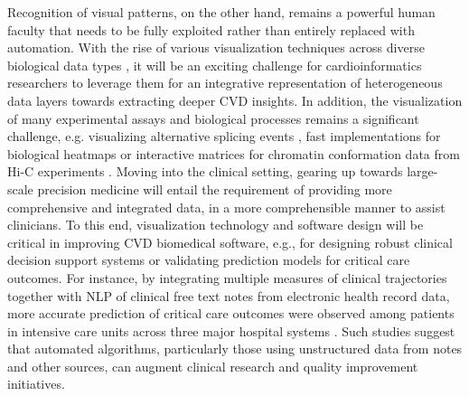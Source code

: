 \documentclass[letter]{bioinfo}
\begin{document}
	Recognition of visual patterns, on the other hand, remains a powerful human faculty that needs to be fully exploited rather than entirely replaced with automation.  With the rise of various visualization techniques across diverse biological data types \citep{Pavlopoulos:2015:Visualizing,ODonoghue:2018:Visualization}, it will be an exciting challenge for cardioinformatics researchers to leverage them for an integrative representation of heterogeneous data layers towards extracting deeper CVD insights. In addition, the visualization of many experimental assays and biological processes remains a significant challenge, e.g. visualizing alternative splicing events \citep{Katz:2015:Quantitative,Strobelt:2016:Vials}, fast implementations for biological heatmaps \citep{Khomtchouk:2017:shinyheatmap} or interactive matrices for chromatin conformation data from Hi-C experiments \citep{Kerpedjiev:2018:HiGlass,Lekschas:2018:HiPiler}. Moving into the clinical setting, gearing up towards large-scale precision medicine will entail the requirement of providing more comprehensive and integrated data, in a more comprehensible manner to assist clinicians.  To this end, visualization technology and software design will be critical in improving CVD biomedical software, e.g., for designing robust clinical decision support systems or validating prediction models for critical care outcomes.  For instance, by integrating multiple measures of clinical trajectories together with NLP of clinical free text notes from electronic health record data, more accurate prediction of critical care outcomes were observed among patients in intensive care units across three major hospital systems \citep{Marafino:2018:Validation}.  Such studies suggest that automated algorithms, particularly those using unstructured data from notes and other sources, can augment clinical research and quality improvement initiatives.
	
	
\end{document}
